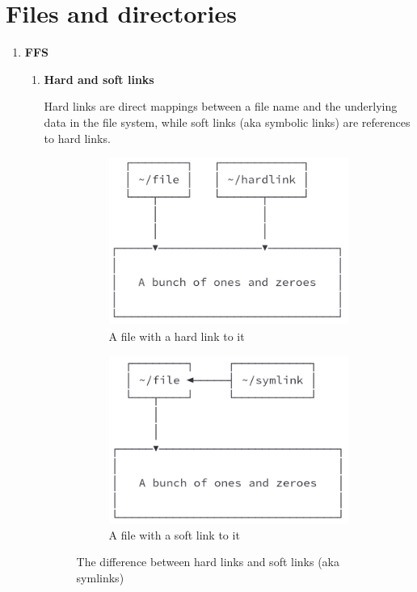 \documentclass{article}
\begin{document}
\section{Files and directories}

\begin{enumerate}
    \item \textbf{FFS}
          \begin{enumerate}
              \item \textbf{Hard and soft links}

                    Hard links are direct mappings between a file name and the underlying data in the file system, while soft links (aka symbolic links) are references to hard links.

                    \begin{figure}[ht]
                        \centering
                        \begin{subfigure}{.45\textwidth}
                            \centering
                            \includegraphics[width=.8\linewidth]{illustrasjoner/hardlink.png}
                            \caption{A file with a hard link to it}
                        \end{subfigure}
                        \begin{subfigure}{.45\textwidth}
                            \centering
                            \includegraphics[width=.8\linewidth]{illustrasjoner/symlink.png}
                            \caption{A file with a soft link to it}
                        \end{subfigure}
                        \caption{The difference between hard links and soft links (aka symlinks)}
                    \end{figure}


\end{enumerate}
\end{enumerate}
\end{document}
